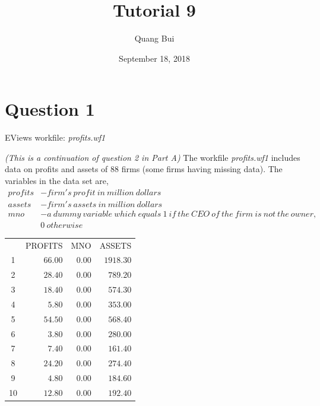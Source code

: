 \documentclass[12pt]{report}
\title{Tutorial 9}
\subtitle
{
\textbf{keywords}: variance, error, heteroskedasticity, homoskedasticity, residual plots, Breusch-Pagan test, White test, WLS

\textbf{estimated reading time}: 36 minutes
}
\author{Quang Bui}
\date{September 18, 2018}
\begin{document}
\maketitle

\section*{Question 1}
\noindent EViews workfile: \textit{profits.wf1}

\noindent \textit{(This is a continuation of question 2 in Part A)} The workfile \textit{profits.wf1} includes data on profits and assets of 88 firms (some firms having missing data). The variables in the data set are,
\begin{align*}
profits &- firm's\ profit\ in\ million\ dollars \\
assets &- firm's\ assets\ in\ million\ dollars \\
mno &- a\ dummy\ variable\ which\ equals\ 1\ if\ the\ CEO\ of\ the\ firm\ is\ not\ the\ owner, \\ 
 &0\ otherwise 
\end{align*}
\vspace{-\baselineskip}
\begin{table}[!htbp]
	\centering
	\begin{tabular}{lrrr}
		\multicolumn{1}{c}{}&\multicolumn{1}{r}{PROFITS}&\multicolumn{1}{r}{MNO}&\multicolumn{1}{r}{ASSETS}\\
		\multicolumn{1}{c}{1}&\multicolumn{1}{r}{$66.00$}&\multicolumn{1}{r}{$0.00$}&\multicolumn{1}{r}{$1918.30$}\\
		\multicolumn{1}{c}{2}&\multicolumn{1}{r}{$28.40$}&\multicolumn{1}{r}{$0.00$}&\multicolumn{1}{r}{$789.20$}\\
		\multicolumn{1}{c}{3}&\multicolumn{1}{r}{$18.40$}&\multicolumn{1}{r}{$0.00$}&\multicolumn{1}{r}{$574.30$}\\
		\multicolumn{1}{c}{4}&\multicolumn{1}{r}{$5.80$}&\multicolumn{1}{r}{$0.00$}&\multicolumn{1}{r}{$353.00$}\\
		\multicolumn{1}{c}{5}&\multicolumn{1}{r}{$54.50$}&\multicolumn{1}{r}{$0.00$}&\multicolumn{1}{r}{$568.40$}\\
		\multicolumn{1}{c}{6}&\multicolumn{1}{r}{$3.80$}&\multicolumn{1}{r}{$0.00$}&\multicolumn{1}{r}{$280.00$}\\
		\multicolumn{1}{c}{7}&\multicolumn{1}{r}{$7.40$}&\multicolumn{1}{r}{$0.00$}&\multicolumn{1}{r}{$161.40$}\\
		\multicolumn{1}{c}{8}&\multicolumn{1}{r}{$24.20$}&\multicolumn{1}{r}{$0.00$}&\multicolumn{1}{r}{$274.40$}\\
		\multicolumn{1}{c}{9}&\multicolumn{1}{r}{$4.80$}&\multicolumn{1}{r}{$0.00$}&\multicolumn{1}{r}{$184.60$}\\
		\multicolumn{1}{c}{10}&\multicolumn{1}{r}{$12.80$}&\multicolumn{1}{r}{$0.00$}&\multicolumn{1}{r}{$192.40$}\\
	\end{tabular}
\end{table}
\end{document}

